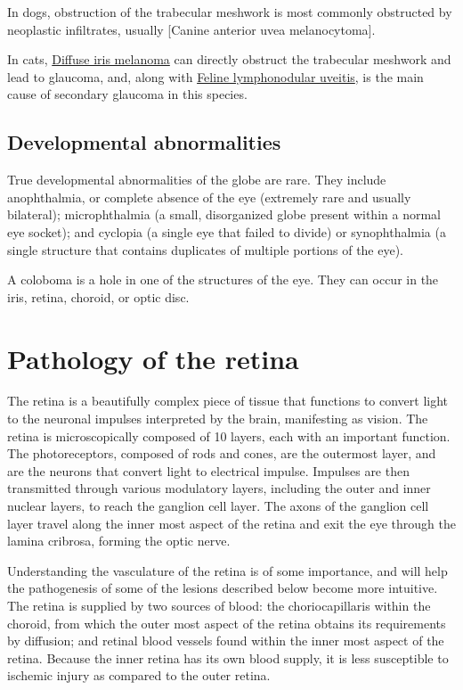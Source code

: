 \documentclass[
  openany]{article}
\begin{document}
In dogs, obstruction of the trabecular meshwork is most commonly obstructed by neoplastic infiltrates, usually {[}Canine anterior uvea melanocytoma{]}.

In cats, \protect\hyperlink{diffuse-iris-melanoma}{Diffuse iris melanoma} can directly obstruct the trabecular meshwork and lead to glaucoma, and, along with \protect\hyperlink{feline-lymphonodular-uveitis}{Feline lymphonodular uveitis}, is the main cause of secondary glaucoma in this species.

\hypertarget{developmental-abnormalities}{%
\subsection{Developmental abnormalities}\label{developmental-abnormalities}}

True developmental abnormalities of the globe are rare. They include anophthalmia, or complete absence of the eye (extremely rare and usually bilateral); microphthalmia (a small, disorganized globe present within a normal eye socket); and cyclopia (a single eye that failed to divide) or synophthalmia (a single structure that contains duplicates of multiple portions of the eye).

A coloboma is a hole in one of the structures of the eye. They can occur in the iris, retina, choroid, or optic disc.

\hypertarget{pathology-of-the-retina}{%
\section{Pathology of the retina}\label{pathology-of-the-retina}}

The retina is a beautifully complex piece of tissue that functions to convert light to the neuronal impulses interpreted by the brain, manifesting as vision. The retina is microscopically composed of 10 layers, each with an important function. The photoreceptors, composed of rods and cones, are the outermost layer, and are the neurons that convert light to electrical impulse. Impulses are then transmitted through various modulatory layers, including the outer and inner nuclear layers, to reach the ganglion cell layer. The axons of the ganglion cell layer travel along the inner most aspect of the retina and exit the eye through the lamina cribrosa, forming the optic nerve.

Understanding the vasculature of the retina is of some importance, and will help the pathogenesis of some of the lesions described below become more intuitive. The retina is supplied by two sources of blood: the choriocapillaris within the choroid, from which the outer most aspect of the retina obtains its requirements by diffusion; and retinal blood vessels found within the inner most aspect of the retina. Because the inner retina has its own blood supply, it is less susceptible to ischemic injury as compared to the outer retina.
\end{document}
